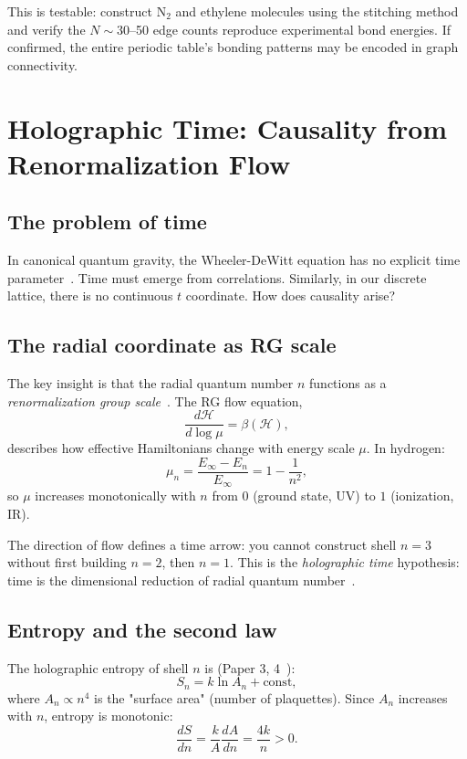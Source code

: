 \documentclass[aps,prd,twocolumn,superscriptaddress,groupedaddress,showpacs]{revtex4-2}
\begin{document}
This is testable: construct N$_2$ and ethylene molecules using the stitching method and verify the $N \sim 30$--50 edge counts reproduce experimental bond energies. If confirmed, the entire periodic table's bonding patterns may be encoded in graph connectivity.

\section{Holographic Time: Causality from Renormalization Flow}

\subsection{The problem of time}

In canonical quantum gravity, the Wheeler-DeWitt equation has no explicit time parameter~\cite{DeWitt1967}. Time must emerge from correlations. Similarly, in our discrete lattice, there is no continuous $t$ coordinate. How does causality arise?

\subsection{The radial coordinate as RG scale}

The key insight is that the radial quantum number $n$ functions as a \emph{renormalization group scale}~\cite{Polchinski1984}. The RG flow equation,
\begin{equation}
\frac{d\mathcal{H}}{d \log \mu} = \beta(\mathcal{H}),
\end{equation}
describes how effective Hamiltonians change with energy scale $\mu$. In hydrogen:
\begin{equation}
\mu_n = \frac{E_\infty - E_n}{E_\infty} = 1 - \frac{1}{n^2},
\end{equation}
so $\mu$ increases monotonically with $n$ from $0$ (ground state, UV) to $1$ (ionization, IR).

The direction of flow defines a time arrow: you cannot construct shell $n=3$ without first building $n=2$, then $n=1$. This is the \emph{holographic time} hypothesis: time is the dimensional reduction of radial quantum number~\cite{Louthan_III}.

\subsection{Entropy and the second law}

The holographic entropy of shell $n$ is (Paper 3, 4~\cite{Louthan_III,Louthan_IV}):
\begin{equation}
S_n = k \ln A_n + \text{const},
\end{equation}
where $A_n \propto n^4$ is the "surface area" (number of plaquettes). Since $A_n$ increases with $n$, entropy is monotonic:
\begin{equation}
\frac{dS}{dn} = \frac{k}{A} \frac{dA}{dn} = \frac{4k}{n} > 0.
\end{equation}
\end{document}
